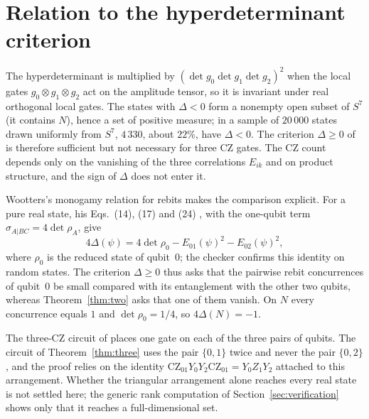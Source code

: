 \documentclass[11pt,a4paper]{article}
\theoremstyle{definition}
\theoremstyle{plain}
\newcommand{\CZ}{\mathrm{CZ}}
\begin{document}
\section{Relation to the hyperdeterminant criterion}\label{sec:delta}
The hyperdeterminant is multiplied by $(\det g_0\det g_1\det g_2)^2$ when the
local gates $g_0\otimes g_1\otimes g_2$ act on the amplitude tensor, so it is
invariant under real orthogonal local gates. The states with $\Delta<0$ form a
nonempty open subset of $S^7$ (it contains $N$), hence a set of positive
measure; in a sample of $20\,000$ states drawn uniformly from $S^7$, $4\,330$,
about $22\%$, have $\Delta<0$. The criterion $\Delta\ge0$ of
\cite{Perdomo2022} is therefore sufficient but not necessary for three CZ
gates. The CZ count depends only on the vanishing of the three correlations
$E_{ik}$ and on product structure, and the sign of $\Delta$ does not enter it.

Wootters's monogamy relation for rebits makes the comparison explicit. For a
pure real state, his Eqs.~(14), (17) and (24) \cite{Wootters2014}, with the
one-qubit term $\sigma_{A|BC}=4\det\rho_A$, give
\[
4\Delta(\psi)=4\det\rho_0-E_{01}(\psi)^2-E_{02}(\psi)^2,
\]
where $\rho_0$ is the reduced state of qubit~$0$; the checker confirms this
identity on random states. The criterion $\Delta\ge0$ thus asks that the
pairwise rebit concurrences of qubit~$0$ be small compared with its
entanglement with the other two qubits, whereas Theorem~\ref{thm:two} asks
that one of them vanish. On $N$ every concurrence equals $1$ and
$\det\rho_0=1/4$, so $4\Delta(N)=-1$.

The three-CZ circuit of \cite{Perdomo2022} places one gate on each of the three
pairs of qubits. The circuit of Theorem~\ref{thm:three} uses the pair
$\{0,1\}$ twice and never the pair $\{0,2\}$, and the proof relies on the
identity $\CZ_{01}Y_0Y_2\CZ_{01}=Y_0Z_1Y_2$ attached to this arrangement.
Whether the triangular arrangement alone reaches every real state is not
settled here; the generic rank computation of Section~\ref{sec:verification}
shows only that it reaches a full-dimensional set.
\end{document}
